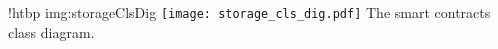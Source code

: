 \namedfigure
{!htbp}
{img:storageClsDig}
{\texttt{[image: storage\_cls\_dig.pdf]}}
{The smart contracts class diagram.}
